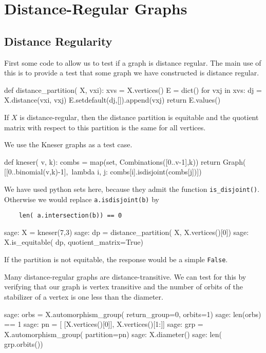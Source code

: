 
\chapter{Distance-Regular Graphs}

\section{Distance Regularity}

First some code to allow us to test if a graph is distance regular.
The main use of this is to provide a test that some graph we have constructed is
distance regular.
\begin{sageblock}
def distance_partition( X, vxi):
    xvs = X.vertices()
    E = dict()
    for vxj in xvs:
        dj = X.distance(vxi, vxj)
        E.setdefault(dj,[]).append(vxj)
    return E.values()    
    \end{sageblock}
If $X$ is distance-regular, then the distance partition is equitable
and the quotient matrix with respect to this partition is the same for all
vertices. 

We use the Kneser graphs as a test case.
\begin{sageblock}
def kneser( v, k):
    combs = map(set, Combinations([0..v-1],k))
    return Graph( [[0..binomial(v,k)-1],\
     lambda i, j: combs[i].isdisjoint(combs[j])])
\end{sageblock}
We have used python sets here, because they admit the function \verb|is_disjoint()|.
Otherwise we would replace \verb|a.isdisjoint(b)| by
\begin{verbatim}
    len( a.intersection(b)) == 0
\end{verbatim}

\begin{sageexample}
sage: X = kneser(7,3)
sage: dp = distance_partition( X, X.vertices()[0])
sage: X.is_equitable( dp, quotient_matrix=True) 
\end{sageexample}
If the partition is not equitable, the response would be a simple
\verb|False|.

Many distance-regular graphs are distance-transitive. We can test for this
by verifying that our graph is vertex transitive and the number of
orbits of the stabilizer of a vertex is one less than the diameter.

\begin{sageexample}
sage: orbs = X.automorphism_group( return_group=0, orbits=1)
sage: len(orbs) == 1 
sage: pn = [ [X.vertices()[0]], X.vertices()[1:]]
sage: grp = X.automorphism_group( partition=pn)
sage: X.diameter()
sage: len( grp.orbits())
\end{sageexample}

